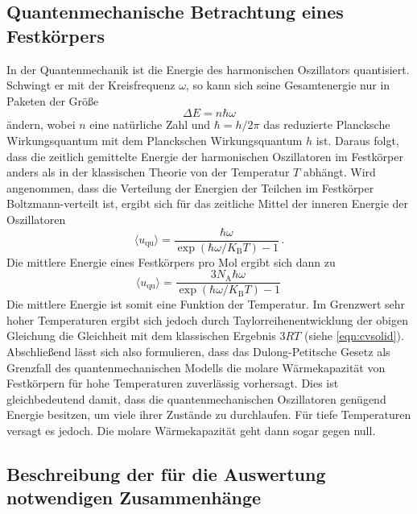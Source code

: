 \subsection{Quantenmechanische Betrachtung eines Festkörpers}
In der Quantenmechanik ist die Energie des harmonischen Oszillators quantisiert.
Schwingt er mit der Kreisfrequenz $\omega$, so kann sich seine Gesamtenergie
nur in Paketen der Größe
\begin{equation}
  \Delta E = n \hbar \omega
  \label{eqn:equantum}
\end{equation}
ändern, wobei $n$ eine natürliche Zahl und $\hbar = h / 2 \pi$ das reduzierte Plancksche
Wirkungsquantum mit dem Planckschen Wirkungsquantum $h$ ist. Daraus folgt, dass
die zeitlich gemittelte Energie der harmonischen Oszillatoren im Festkörper
anders als in der klassischen Theorie von der Temperatur $T$ abhängt. Wird angenommen,
dass die Verteilung der Energien der Teilchen im Festkörper Boltzmann-verteilt ist,
ergibt sich für das zeitliche Mittel der inneren Energie der Oszillatoren
\begin{equation}
  \langle u_\text{qu} \rangle = \frac{\hbar \omega}{\exp(\hbar \omega / K_\text{B} T) - 1}\,.
  \label{eqn:uqu}
\end{equation}
Die mittlere Energie eines Festkörpers pro Mol ergibt sich dann zu
\begin{equation}
  \langle u_\text{qu} \rangle = \frac{3 N_\text{A} \hbar \omega}{\exp(\hbar \omega / K_\text{B} T) - 1}\,
  \label{eqn:uqu}
\end{equation}
Die mittlere Energie ist somit eine Funktion der Temperatur. Im Grenzwert sehr hoher
Temperaturen ergibt sich jedoch durch Taylorreihenentwicklung der obigen Gleichung
die Gleichheit mit dem klassischen Ergebnis $3 R T$ (siehe \eqref{eqn:cvsolid}). \newline
Abschließend lässt sich also formulieren, dass das Dulong-Petitsche Gesetz als Grenzfall
des quantenmechanischen Modells die molare Wärmekapazität von Festkörpern für hohe
Temperaturen zuverlässig vorhersagt. Dies ist gleichbedeutend damit, dass die quantenmechanischen
Oszillatoren genügend Energie besitzen, um viele ihrer Zustände zu durchlaufen.
Für tiefe Temperaturen versagt es jedoch. Die molare Wärmekapazität geht dann sogar gegen
null.

\subsection{Beschreibung der für die Auswertung notwendigen Zusammenhänge}

